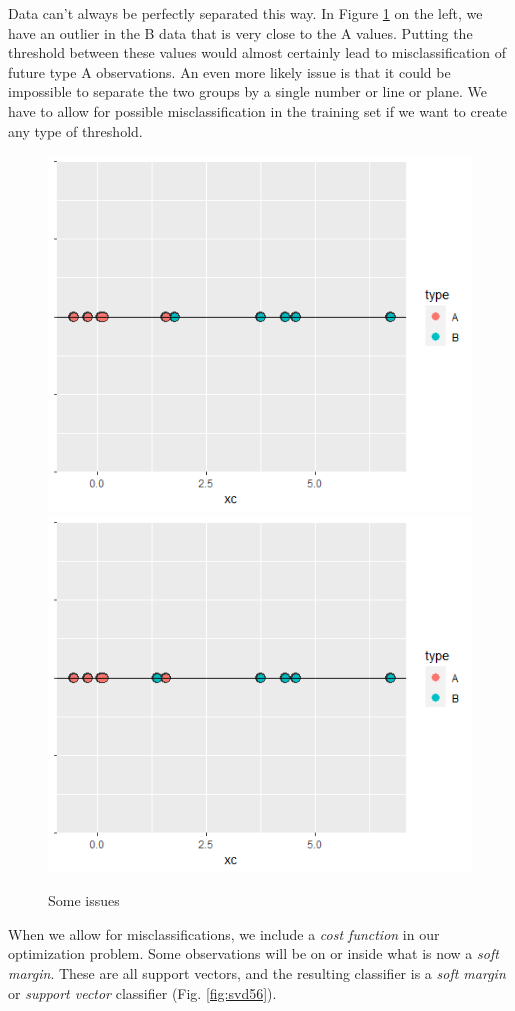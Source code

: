 \documentclass[
]{book}
\theoremstyle{definition}
\theoremstyle{definition}
\theoremstyle{definition}
\theoremstyle{definition}
\theoremstyle{remark}
\begin{document}
Data can't always be perfectly separated this way. In Figure \ref{fig:svdb1} on the left, we have an outlier in the B data that is very close to the A values. Putting the threshold between these values would almost certainly lead to misclassification of future type A observations. An even more likely issue is that it could be impossible to separate the two groups by a single number or line or plane. We have to allow for possible misclassification in the training set if we want to create any type of threshold.

\begin{figure}

{\centering \includegraphics[width=0.4\linewidth]{images/svdb1} \includegraphics[width=0.4\linewidth]{images/svdb2} 

}

\caption{Some issues}\label{fig:svdb1}
\end{figure}

When we allow for misclassifications, we include a \emph{cost function} in our optimization problem. Some observations will be on or inside what is now a \emph{soft margin}. These are all support vectors, and the resulting classifier is a \emph{soft margin} or \emph{support vector} classifier (Fig. \ref{fig:svd56}).
\end{document}
